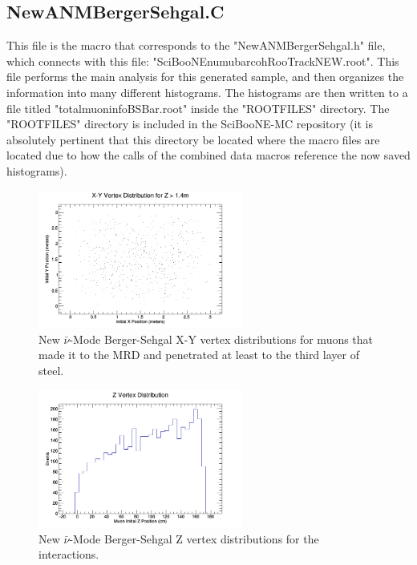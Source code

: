 \documentclass[11pt]{article}
\begin{document}
\subsection{NewANMBergerSehgal.C}
This file is the macro that corresponds to the "NewANMBergerSehgal.h" file, which connects with this file: "SciBooNE\textunderscore numubar\textunderscore coh\textunderscore RooTrack\textunderscore NEW.root". This file performs the main analysis for this generated sample, and then organizes the information into many different histograms. The histograms are then written to a file titled "totalmuoninfoBSBar.root" inside the "ROOTFILES" directory. The "ROOTFILES" directory is included in the SciBooNE-MC repository (it is absolutely pertinent that this directory be located where the macro files are located due to how the calls of the combined data macros reference the now saved histograms).

\begin{figure}[H]
\centering
\includegraphics[width=0.6\textwidth]{NewANMBergerSehgalImages/1-X-YVertexDistributionANMBS.png}
\caption{New $\bar{\nu}$-Mode Berger-Sehgal X-Y vertex distributions for muons that made it to the MRD and penetrated at least to the third layer of steel.}
\end{figure}

\begin{figure}[H]
\centering
\includegraphics[width=0.6\textwidth]{NewANMBergerSehgalImages/2-ZVertexDistributionANMBS.png}
\caption{New $\bar{\nu}$-Mode Berger-Sehgal Z vertex distributions for the interactions.}
\end{figure}
\end{document}
